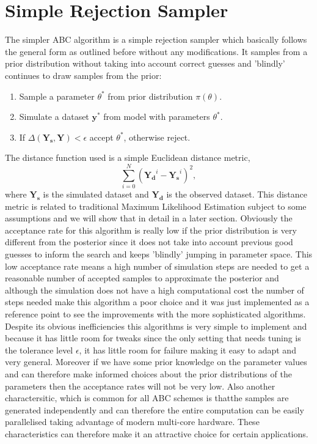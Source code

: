 \section{Simple Rejection Sampler}
\label{sec:rejection_sampler}
The simpler ABC algorithm is a simple rejection sampler\cite[] {pritchard1999population} which basically follows the general form as outlined before without any modifications. It samples from a prior distribution without taking into account correct guesses and 'blindly' continues to draw samples from the prior:
\begin{enumerate}[noitemsep]
\item{Sample a parameter $\theta ^*$ from prior distribution $\pi(\theta)$.}
\item{Simulate a dataset $\mathbf{y}^*$  from model with parameters $\theta ^*$.}
\item{If $\Delta(\mathbf{Y_{s}}, \mathbf{Y}) < \epsilon$ accept $\theta^*$, otherwise reject.}
\end{enumerate}
The distance function used is a simple Euclidean distance metric,
\begin{equation}
\sum_{i=0}^{N} (\mathbf{Y_{d}}^{i} -\mathbf{Y_{s}}^{i})^2,
\end{equation}
where $\mathbf{Y_{s}}$ is the simulated dataset and $\mathbf{Y_{d}}$ is the observed dataset. This distance metric is related to traditional Maximum Likelihood Estimation subject to some assumptions and we will show that in detail in a later section. Obviously the acceptance rate for this algorithm is really low if the prior distribution is very different from the posterior since it does not take into account previous good guesses to inform the search and keeps 'blindly' jumping in parameter space. This low acceptance rate means a high number of simulation steps are needed to get a reasonable number of accepted samples to approximate the posterior and although the simulation does not have a high computational cost the number of steps needed make this algorithm a poor choice and it was just implemented as a reference point to see the improvements with the more sophisticated algorithms. Despite its obvious inefficiencies this algorithms is very simple to implement and because it has little room for tweaks since the only setting that needs tuning is the tolerance level $\epsilon$, it has little room for failure making it easy to adapt and very general. Moreover if we have some prior knowledge on the parameter values and can therefore make informed choices about the prior distributions of the parameters then the acceptance rates will not be very low. Also another charactersitic, which is common for all ABC schemes is thatthe samples are generated independently and can therefore the entire computation can be easily parallelised taking advantage of modern multi-core hardware. These characteristics can therefore make it an attractive choice for certain applications.

